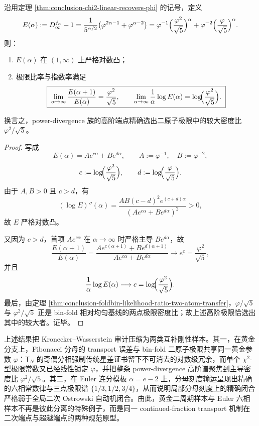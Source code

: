 \begin{proposition}\label{prop:conclusion-power-divergence-logconvex-dominant-ratio}
沿用定理 \ref{thm:conclusion-chi2-linear-recovers-phi} 的记号，定义
\[
E(\alpha):=D_\infty^{f_\alpha}+1
=
\frac{1}{5^{\alpha/2}}\bigl(\varphi^{2\alpha-1}+\varphi^{\alpha-2}\bigr)
=
\varphi^{-1}\Bigl(\frac{\varphi^2}{\sqrt5}\Bigr)^\alpha
+
\varphi^{-2}\Bigl(\frac{\varphi}{\sqrt5}\Bigr)^\alpha.
\]
则：
\begin{enumerate}
  \item \(E(\alpha)\) 在 \((1,\infty)\) 上严格对数凸；
  \item 极限比率与指数率满足
  \[
  \boxed{\;
  \lim_{\alpha\to\infty}\frac{E(\alpha+1)}{E(\alpha)}
  =
  \frac{\varphi^2}{\sqrt5},
  \qquad
  \lim_{\alpha\to\infty}\frac1\alpha\log E(\alpha)
  =
  \log\!\Bigl(\frac{\varphi^2}{\sqrt5}\Bigr).\;}
  \]
\end{enumerate}
换言之，power-divergence 族的高阶端点精确选出二原子极限中的较大密度比 \(\varphi^2/\sqrt5\)。
\end{proposition}
\begin{proof}
写成
\[
E(\alpha)=Ae^{c\alpha}+Be^{d\alpha},
\qquad
A:=\varphi^{-1},\quad B:=\varphi^{-2},
\]
\[
c:=\log\!\Bigl(\frac{\varphi^2}{\sqrt5}\Bigr),
\qquad
d:=\log\!\Bigl(\frac{\varphi}{\sqrt5}\Bigr).
\]
由于 \(A,B>0\) 且 \(c>d\)，有
\[
(\log E)''(\alpha)
=
\frac{AB(c-d)^2e^{(c+d)\alpha}}{(Ae^{c\alpha}+Be^{d\alpha})^2}>0,
\]
故 \(E\) 严格对数凸。

又因为 \(c>d\)，首项 \(Ae^{c\alpha}\) 在 \(\alpha\to\infty\) 时严格主导 \(Be^{d\alpha}\)，故
\[
\frac{E(\alpha+1)}{E(\alpha)}
=
\frac{Ae^{c(\alpha+1)}+Be^{d(\alpha+1)}}{Ae^{c\alpha}+Be^{d\alpha}}
\longrightarrow e^c
=
\frac{\varphi^2}{\sqrt5},
\]
并且
\[
\frac1\alpha\log E(\alpha)\longrightarrow c
=
\log\!\Bigl(\frac{\varphi^2}{\sqrt5}\Bigr).
\]
最后，由定理 \ref{thm:conclusion-foldbin-likelihood-ratio-two-atom-transfer}，\(\varphi/\sqrt5\) 与 \(\varphi^2/\sqrt5\) 正是 bin-fold 相对均匀基线的两点极限密度比；故上述高阶极限恰选出其中的较大者。证毕。
\end{proof}



上述结果把 Kronecker--Wasserstein 审计压缩为两类互补刚性样本。其一，在黄金分支上，Fibonacci 分母的 transport 误差与 bin-fold 二原子极限共享同一黄金参数 \(\varphi\)：\(\mathsf T_N\) 的奇偶分相强制传统星差证书留下不可消去的对数级冗余，而单个 \(\chi^2\)-型极限常数又已经线性锁定 \(\varphi\)，并把整条 power-divergence 高阶谱聚焦到主导密度比 \(\varphi^2/\sqrt5\)。其二，在 Euler 连分模板 \(\alpha=e-2\) 上，分母刻度输运呈现出精确的六相常数律与三点极限谱 \(\{1/3,1/2,3/4\}\)，从而说明局部分母刻度上的精确闭合严格弱于全局二次 Ostrowski 自动机闭合。由此，黄金二周期样本与 Euler 六相样本不再是彼此分离的特殊例子，而是同一 continued-fraction transport 机制在二次端点与超越端点的两种规范原型。

\endinput
